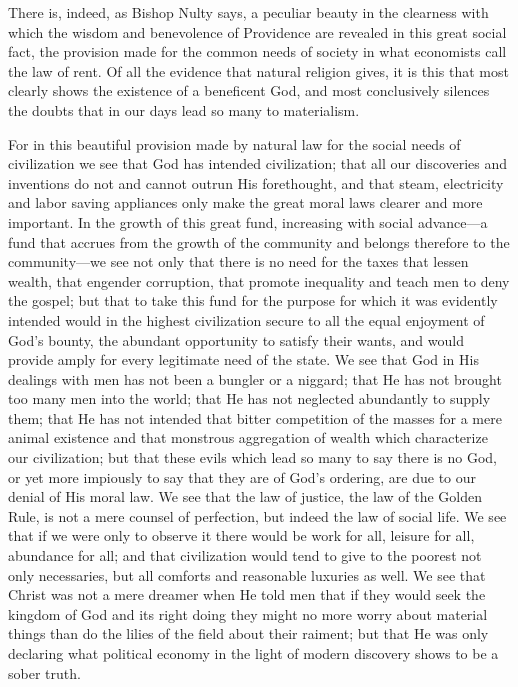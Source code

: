 \documentclass{book}
\begin{document}
There is, indeed, as Bishop Nulty says, a peculiar beauty in the clearness with which the wisdom and benevolence of Providence are revealed in this great social fact, the provision made for the common needs of society in what economists call the law of rent. Of all the evidence that natural religion gives, it is this that most clearly shows the existence of a beneficent God, and most conclusively silences the doubts that in our days lead so many to materialism.

For in this beautiful provision made by natural law for the social needs of civilization we see that God has intended civilization; that all our discoveries and inventions do not and cannot outrun His forethought, and that steam, electricity and labor saving appliances only make the great moral laws clearer and more important. In the growth of this great fund, increasing with social advance—a fund that accrues from the growth of the community and belongs therefore to the community—we see not only that there is no need for the taxes that lessen wealth, that engender corruption, that promote inequality and teach men to deny the gospel; but that to take this fund for the purpose for which it was evidently intended would in the highest civilization secure to all the equal enjoyment of God’s bounty, the abundant opportunity to satisfy their wants, and would provide amply for every legitimate need of the state. We see that God in His dealings with men has not been a bungler or a niggard; that He has not brought too many men into the world; that He has not neglected abundantly to supply them; that He has not intended that bitter competition of the masses for a mere animal existence and that monstrous aggregation of wealth which characterize our civilization; but that these evils which lead so many to say there is no God, or yet more impiously to say that they are of God’s ordering, are due to our denial of His moral law. We see that the law of justice, the law of the Golden Rule, is not a mere counsel of perfection, but indeed the law of social life. We see that if we were only to observe it there would be work for all, leisure for all, abundance for all; and that civilization would tend to give to the poorest not only necessaries, but all comforts and reasonable luxuries as well. We see that Christ was not a mere dreamer when He told men that if they would seek the kingdom of God and its right doing they might no more worry about material things than do the lilies of the field about their raiment; but that He was only declaring what political economy in the light of modern discovery shows to be a sober truth.
\end{document}

